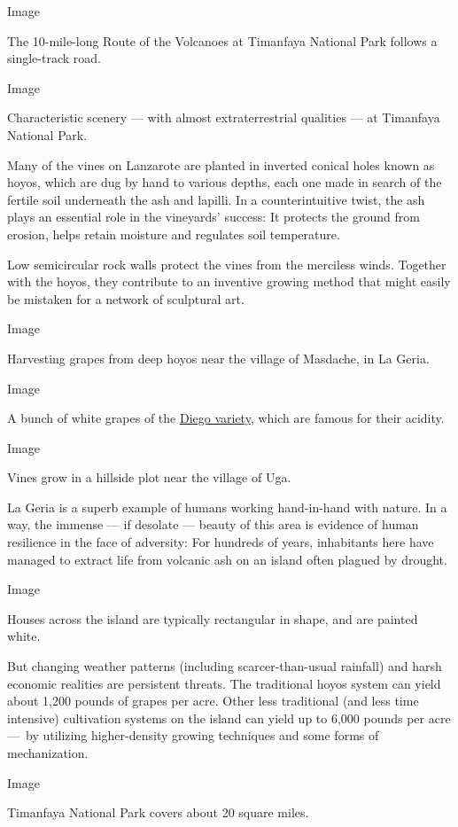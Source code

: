 Image

The 10-mile-long Route of the Volcanoes at Timanfaya National Park
follows a single-track road.

Image

Characteristic scenery --- with almost extraterrestrial qualities --- at
Timanfaya National Park.

Many of the vines on Lanzarote are planted in inverted conical holes
known as hoyos, which are dug by hand to various depths, each one made
in search of the fertile soil underneath the ash and lapilli. In a
counterintuitive twist, the ash plays an essential role in the
vineyards' success: It protects the ground from erosion, helps retain
moisture and regulates soil temperature.

Low semicircular rock walls protect the vines from the merciless winds.
Together with the hoyos, they contribute to an inventive growing method
that might easily be mistaken for a network of sculptural art.

Image

Harvesting grapes from deep hoyos near the village of Masdache, in La
Geria.

Image

A bunch of white grapes of the
\href{https://en.wikipedia.org/wiki/Vigiriega}{Diego variety}, which are
famous for their acidity.

Image

Vines grow in a hillside plot near the village of Uga.

La Geria is a superb example of humans working hand-in-hand with nature.
In a way, the immense --- if desolate --- beauty of this area is
evidence of human resilience in the face of adversity: For hundreds of
years, inhabitants here have managed to extract life from volcanic ash
on an island often plagued by drought.

Image

Houses across the island are typically rectangular in shape, and are
painted white.

But changing weather patterns (including scarcer-than-usual rainfall)
and harsh economic realities are persistent threats. The traditional
hoyos system can yield about 1,200 pounds of grapes per acre. Other less
traditional (and less time intensive) cultivation systems on the island
can yield up to 6,000 pounds per acre ---~by utilizing higher-density
growing techniques and some forms of mechanization.

Image

Timanfaya National Park covers about 20 square miles.

